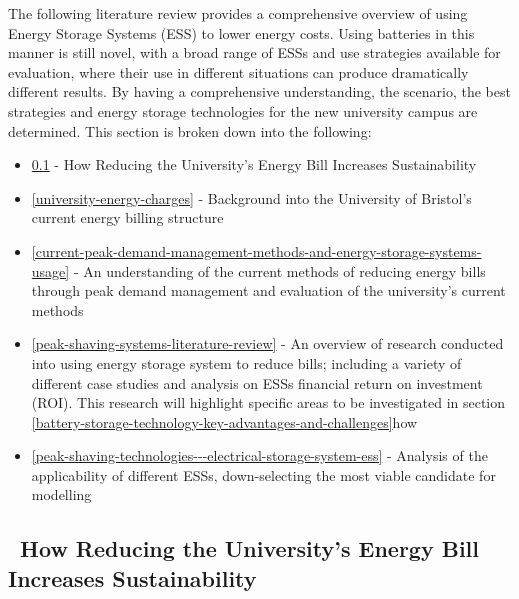 The following literature review provides a comprehensive overview of
using Energy Storage Systems (ESS) to lower energy costs. Using
batteries in this manner is still novel, with a broad range of ESSs and
use strategies available for evaluation, where their use in different
situations can produce dramatically different results. By having a
comprehensive understanding, the scenario, the best strategies and
energy storage technologies for the new university campus are
determined. This section is broken down into the following:

\begin{itemize}
\tightlist
\item
  \ref{how-reducing-the-universitys-energy-bill-increases-sustainability}
  - How Reducing the University's Energy Bill Increases Sustainability
\item
  \ref{university-energy-charges} - Background into the University of
  Bristol's current energy billing structure
\item
  \ref{current-peak-demand-management-methods-and-energy-storage-systems-usage}
  - An understanding of the current methods of reducing energy bills
  through peak demand management and evaluation of the university's
  current methods
\item
  \ref{peak-shaving-systems-literature-review} - An overview of research
  conducted into using energy storage system to reduce bills; including
  a variety of different case studies and analysis on ESSs financial
  return on investment (ROI). This research will highlight specific
  areas to be investigated in section
  \ref{battery-storage-technology-key-advantages-and-challenges}how
\item
  \ref{peak-shaving-technologies---electrical-storage-system-ess} -
  Analysis of the applicability of different ESSs, down-selecting the
  most viable candidate for modelling
\end{itemize}

\subsection{~How Reducing the University's Energy Bill Increases
Sustainability}\label{how-reducing-the-universitys-energy-bill-increases-sustainability}

